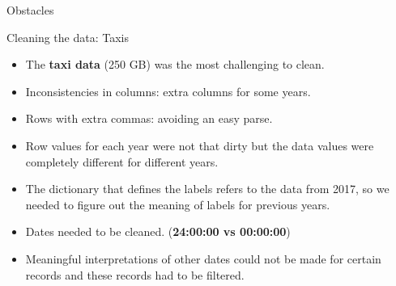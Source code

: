 \documentclass[10pt,ignorenonframetext,]{beamer}
\providecommand{\tightlist}{%
  \setlength{\itemsep}{0pt}\setlength{\parskip}{0pt}}
\begin{document}
\begin{frame}{%
\protect\hypertarget{obstacles}{%
Obstacles}}

\begin{block}{Cleaning the data: Taxis}

\begin{itemize}[<+->]
\tightlist
\item
  The \textbf{taxi data} (250 GB) was the most challenging to clean.
\end{itemize}

\begin{itemize}[<+->]
\tightlist
\item
  Inconsistencies in columns: extra columns for some years.
\end{itemize}

\begin{itemize}[<+->]
\tightlist
\item
  Rows with extra commas: avoiding an easy parse.
\end{itemize}

\begin{itemize}[<+->]
\tightlist
\item
  Row values for each year were not that dirty but the data values were
  completely different for different years.
\end{itemize}

\begin{itemize}[<+->]
\tightlist
\item
  The dictionary that defines the labels refers to the data from 2017,
  so we needed to figure out the meaning of labels for previous years.
\end{itemize}

\begin{itemize}[<+->]
\tightlist
\item
  Dates needed to be cleaned. (\textbf{24:00:00 vs 00:00:00})
\end{itemize}

\begin{itemize}[<+->]
\tightlist
\item
  Meaningful interpretations of other dates could not be made for
  certain records and these records had to be filtered.
\end{itemize}

\end{block}

\end{frame}
\end{document}

